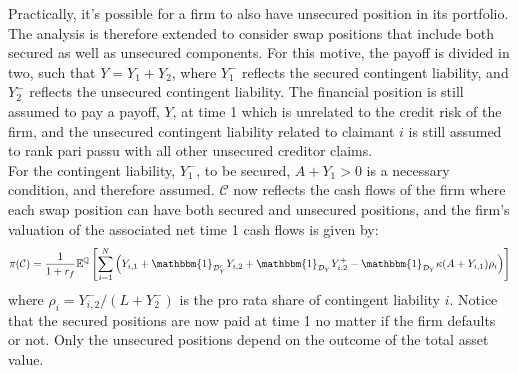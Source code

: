 \documentclass[../main.tex]{subfiles}
\begin{document}
        Practically, it's possible for a firm to also have unsecured position in its portfolio.
        The analysis is therefore extended to consider swap positions that include both secured as well as unsecured components.
        For this motive, the payoff is divided in two, such that $Y=Y_1 + Y_2$, where $Y_1^{-}$ reflects the secured contingent liability, and $Y_2^{-}$ reflects the unsecured contingent liability.
        The financial position is still assumed to pay a payoff, $Y$, at time 1 which is unrelated to the credit risk of the firm, and the unsecured contingent liability related to claimant $i$ is still assumed to rank pari passu with all other unsecured creditor claims.\\
        For the contingent liability, $Y_1^{-}$, to be secured, $A+Y_1 > 0$ is a necessary condition, and therefore assumed.
        $\mathcal{C}$ now reflects the cash flows of the firm where each swap position can have both secured and unsecured positions, and the firm's valuation of the associated net time 1 cash flows is given by:
        \begin{equation}
            \pi(\mathcal{C}) = \discountfactor \mathbb{E}^{\mathbb{Q}}\left[
            \sum_{i=1}^{N} \left(
                Y_{i,1}
                + \mathbbm{1}_{\mathcal{D}_{Y}^{c}}Y_{i,2}
                + \mathbbm{1}_{\mathcal{D}_{Y}} Y_{i,2}^{+}
                - \mathbbm{1}_{\mathcal{D}_{Y}} \kappa (A + Y_{i,1}) \rho_{i}
            \right)\right]
        \end{equation}
        where $\rho_{i} = Y_{i,2}^{-}/(L + Y_{2}^{-})$ is the pro rata share of contingent liability $i$. Notice that the secured positions are now paid at time 1 no matter if the firm defaults or not. Only the unsecured positions depend on the outcome of the total asset value.
        
\end{document}
